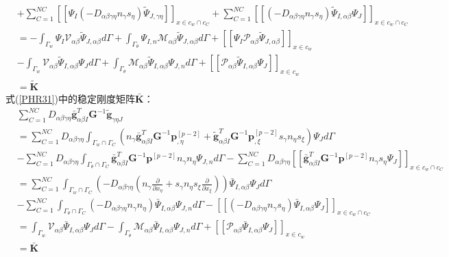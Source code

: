 \begin{equation}
\begin{split}
    &+\sum_{C=1}^{N\!C}[[\Psi_I(-D_{\alpha\beta\gamma\eta}n_{\gamma}s_{\eta})\tilde{\Psi}_{J,\gamma\eta}]]_{x\in{c_w}\cap{c_C}}+\sum_{C=1}^{N\!C}[[(-D_{\alpha\beta\gamma\eta}n_{\gamma}s_{\eta})\tilde{\Psi}_{I,\alpha\beta}\Psi_J]]_{x\in{c_w}\cap{c_C}}\\
    &=-\int_{\Gamma_w}\Psi_I\mathcal{V}_{\alpha\beta}\tilde{\Psi}_{J,\alpha\beta}d\Gamma+\int_{\Gamma_{\theta}}\Psi_{I,n}\mathcal{M}_{\alpha\beta}\tilde{\Psi}_{J,\alpha\beta}d\Gamma+[[\Psi_I\mathcal{P}_{\alpha\beta}\tilde{\Psi}_{J,\alpha\beta}]]_{x\in{c_w}}\\
    &-\int_{\Gamma_w}\mathcal{V}_{\alpha\beta}\tilde{\Psi}_{I,\alpha\beta}\Psi_Jd\Gamma+\int_{\Gamma_{\theta}}\mathcal{M}_{\alpha\beta}\tilde{\Psi}_{I,\alpha\beta}\Psi_{J,n}d\Gamma+[[\mathcal{P}_{\alpha\beta}\tilde{\Psi}_{I,\alpha\beta}\Psi_J]]_{x\in{c_w}}\\
    &=\tilde{\pmb K}
\end{split}
\end{equation}
\newpage
式(\ref{PHR31})中的稳定刚度矩阵$\bar{\pmb{K}}$：
\begin{equation}
\begin{split}
    &\sum_{C=1}^{N\!C}D_{\alpha\beta\gamma\eta}\bar{\pmb g}_{\alpha\beta I}^T\pmb G^{-1}\tilde{\pmb g}_{\gamma\eta J}\\
    &=\sum_{C=1}^{N\!C}D_{\alpha\beta\gamma\eta}\int_{{\Gamma_w}\cap{\Gamma_C}}(n_{\gamma}
    \bar{\pmb g}_{\alpha\beta I}^T\pmb G^{-1}\pmb{p}^{[p-2]}_{,\eta}+\tilde{\pmb g}_{\alpha\beta I}^T
    \pmb G^{-1}\pmb{p}^{[p-2]}_{,\xi}s_{\gamma}n_{\eta}s_{\xi})\Psi_Jd\Gamma\\
    &-\sum_{C=1}^{N\!C}D_{\alpha\beta\gamma\eta}\int_{{\Gamma_{\theta}}\cap{\Gamma_C}}
    \bar{\pmb g}_{\alpha\beta I}^T\pmb G^{-1}\pmb{p}^{[p-2]}n_{\gamma}n_{
    \eta}\Psi_{J,n}d\Gamma
    -\sum_{C=1}^{N\!C}D_{\alpha\beta\gamma\eta}[[\bar{\pmb g}_{\alpha\beta I}^T\pmb G^{-1}\pmb{p}^{[p-2]}n_{\gamma}s_{\eta}\Psi_J]]_{x\in{c_w}\cap{c_C}}\\
    &=\sum_{C=1}^{N\!C}\int_{{\Gamma_w}\cap{\Gamma_C}}(-D_{\alpha\beta\gamma\eta}(n_{\gamma}\frac{\partial}{\partial x_{\eta}}+s_{\gamma}n_{\eta}s_{\xi}\frac{\partial}{\partial x_{\xi}}))\bar{\Psi}_{I,\alpha\beta}\Psi_Jd\Gamma\\
    &-\sum_{C=1}^{N\!C}\int_{{\Gamma_{\theta}}\cap{\Gamma_C}}(-D_{\alpha\beta\gamma\eta}n_{\gamma}n_{\eta})\bar{\Psi}_{I,\alpha\beta}\Psi_{J,n}d\Gamma
    -[[(-D_{\alpha\beta\gamma\eta}n_{\gamma}s_{\eta})\bar{\Psi}_{I,\alpha\beta}\Psi_J]]_{x\in{c_w}\cap{c_C}}\\
    &=\int_{\Gamma_w}\mathcal{V}_{\alpha\beta}\bar{\Psi}_{I,\alpha\beta}\Psi_Jd\Gamma-\int_{\Gamma_{\theta}}\mathcal{M}_{\alpha\beta}\bar{\Psi}_{I,\alpha\beta}\Psi_{J,n}d\Gamma+[[\mathcal{P}_{\alpha\beta}\bar{\Psi}_{I,\alpha\beta}\Psi_J]]_{x\in{c_w}}\\
    &=\bar{\pmb K}
\end{split}
\end{equation}
